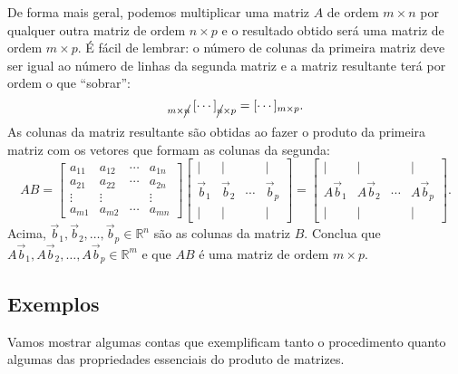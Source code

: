 De forma mais geral, podemos multiplicar uma matriz $A$ de ordem $m \times n$ por qualquer outra matriz de ordem $n \times p$ e o resultado obtido será uma matriz de ordem $m \times p$. É fácil de lembrar: o número de colunas da primeira matriz deve ser igual ao número de linhas da segunda matriz e a matriz resultante terá por ordem o que  ``sobrar'':
\begin{equation}
[\cdots]_{m \times \cancel{n}} \, [\cdots]_{\cancel{n} \times p} = [\cdots]_{m \times p}.
\end{equation} As colunas da matriz resultante são obtidas ao fazer o produto da primeira matriz com os vetores que formam as colunas da segunda:
\begin{equation}
A B =
\left[
\begin{array}{cccc}
a_{11} & a_{12} & \cdots & a_{1n} \\
a_{21} & a_{22} & \cdots & a_{2n} \\
\vdots & \vdots &        & \vdots \\
a_{m1} & a_{m2} & \cdots & a_{mn} 
\end{array}
\right]
\left[
\begin{array}{cccc}
| & |  &   & | \\
\vec{b}_{1} & \vec{b}_{2} & \cdots & \vec{b}_{p} \\
| & |  &   & | 
\end{array}
\right] =
\left[
\begin{array}{cccc}
| & |  &   & | \\
A\vec{b}_{1} & A\vec{b}_{2} & \cdots & A\vec{b}_{p} \\
| & |  &   & | 
\end{array}
\right].
\end{equation} Acima, $\vec{b}_{1}, \vec{b}_{2}, \dots, \vec{b}_{p} \in \mathbb{R}^n$ são as colunas da matriz $B$. Conclua que $A\vec{b}_{1}, A\vec{b}_{2}, \dots, A\vec{b}_{p} \in \mathbb{R}^m$ e que $AB$ é uma matriz de ordem $m \times p$.

\subsection{Exemplos}

Vamos mostrar algumas contas que exemplificam tanto o procedimento quanto algumas das propriedades essenciais do produto de matrizes.


